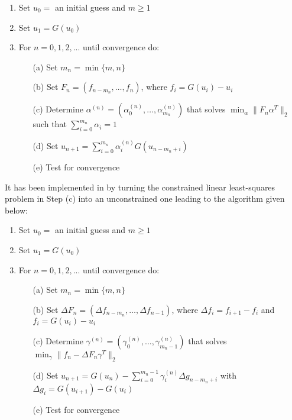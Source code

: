\vspace{1ex}
\begin{enumerate}
   \item Set $u_0 = $ an initial guess and $m \ge 1$
   \item Set $u_1 = G(u_0)$ 
   \item For $n = 0, 1, 2,...$ until convergence do:
      \begin{itemize}
          \item[(a)] Set $m_n = \min\{m,n\}$
          \item[(b)] Set $F_{n} = (f_{n-m_n}, \ldots, f_n)$, where $f_i=G(u_i)-u_i$
          \item[(c)] Determine $\alpha^{(n)} = (\alpha_0^{(n)}, \ldots, \alpha_{m_n}^{(n)})$ that solves 
          $\min_\alpha  \| F_n \alpha^T \|_2$ such that $\sum_{i=0}^{m_n} \alpha_i = 1$
          \item[(d)] Set $u_{n+1} = \sum_{i=0}^{m_n} \alpha_i^{(n)} G(u_{n-m_n+i})$
          \item[(e)] Test for convergence
      \end{itemize}
\end{enumerate}

It has been implemented in {\kinsol} by turning the constrained linear least-squares
problem in Step (c) into an unconstrained one leading to the algorithm given below:

\vspace{1ex}
\begin{enumerate}
   \item Set $u_0 = $ an initial guess and $m \ge 1$
   \item Set $u_1 = G(u_0)$ 
   \item For $n = 0, 1, 2,...$ until convergence do:
      \begin{itemize}
          \item[(a)] Set $m_n = \min\{m,n\}$
          \item[(b)] Set $\Delta F_{n} = (\Delta f_{n-m_n}, \ldots, \Delta f_{n-1})$,
                where $\Delta f_i = f_{i+1} - f_i$ and $f_i=G(u_i)-u_i$
          \item[(c)] Determine $\gamma^{(n)} = (\gamma_0^{(n)}, \ldots, \gamma_{m_n-1}^{(n)})$
                that solves $\min_\gamma  \| f_n - \Delta F_n \gamma^T \|_2$ 
          \item[(d)] Set $u_{n+1} = G(u_n)-\sum_{i=0}^{m_n-1} \gamma_i^{(n)}
               \Delta g_{n-m_n+i}$ with $\Delta g_i = G(u_{i+1}) - G(u_i)$
          \item[(e)] Test for convergence
      \end{itemize}
\end{enumerate}


